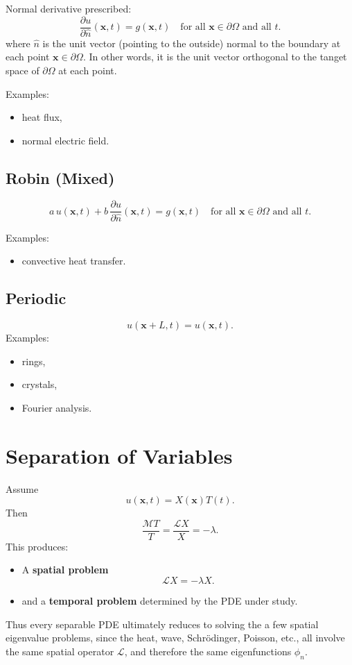 \documentclass[aps,prl,twocolumn,groupedaddress]{revtex4-2}
\begin{document}
Normal derivative prescribed:
$$
\frac{\partial u}{\partial \hat n}(\mathbf x,t)=g(\mathbf x,t)
\quad\text{for all $\mathbf x\in \partial\Omega$ and all $t$.}
$$
where $\hat n$ is the unit vector (pointing to the outside) normal to the boundary at each point $\mathbf x\in \partial \Omega$.
In other words, it is the unit vector orthogonal to the tanget space of $\partial \Omega$ at each point.

Examples:
\begin{itemize}
\item heat flux,
\item normal electric field.
\end{itemize}

\subsection{Robin (Mixed)}

$$
a\, u(\mathbf x,t)+b\,\frac{\partial u}{\partial \hat n}(\mathbf x,t)=g(\mathbf x,t)
\quad\text{for all $\mathbf x\in \partial\Omega$ and all $t$.}
$$

Examples:
\begin{itemize}
\item convective heat transfer.
\end{itemize}

\subsection{Periodic}

$$
u(\mathbf x+L,t)=u(\mathbf x,t).
$$
Examples:
\begin{itemize}
\item rings,
\item crystals,
\item Fourier analysis.
\end{itemize}

\section{Separation of Variables}

Assume
$$
u(\mathbf x,t)
=
X(\mathbf x)T(t).
$$
Then
$$
\frac{\mathcal M T}{T}
=
\frac{\mathcal L X}{X}
=
-\lambda.
$$
This produces:

\begin{itemize}
\item A {\bf spatial problem}
$$
\mathcal L X
=
-\lambda X.
$$
\item and a {\bf temporal problem} determined by the PDE under study.
\end{itemize}
Thus every separable PDE ultimately reduces to solving the a few spatial eigenvalue problems, since the heat, wave, Schr\"odinger, Poisson, etc., all involve the same spatial operator $\mathcal L$, and therefore the same eigenfunctions $\phi_n$.
\end{document}
